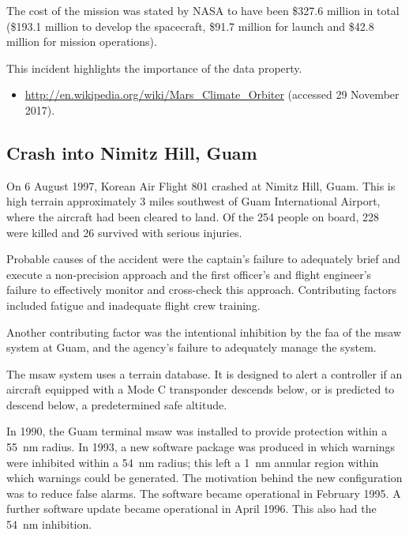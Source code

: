 The cost of the mission was stated by NASA to have been \$327.6 million in total (\$193.1 million to develop the spacecraft, \$91.7 million for launch and \$42.8 million for mission operations). 

This incident highlights the importance of the  \gls{data property}.

\begin{itemize}
  \item \raggedright{\href{http://en.wikipedia.org/wiki/Mars_Climate_Orbiter}{http://en.wikipedia.org/wiki/Mars\_Climate\_Orbiter} (accessed 29 November 2017).}
\end{itemize}


\subsection{Crash into Nimitz Hill, Guam \label{bkm:incacc:nimitzhill}}
On 6 August 1997, Korean Air Flight 801 crashed at Nimitz Hill, Guam. This is high terrain approximately 3 miles southwest of Guam International Airport, where the aircraft had been cleared to land. Of the 254 people on board, 228 were killed and 26 survived with serious injuries.

Probable causes of the accident were the captain's failure to adequately brief and execute a non-precision approach and the first officer's and flight engineer's failure to effectively monitor and cross-check this approach. Contributing factors included fatigue and inadequate flight crew training.

Another contributing factor was the intentional inhibition by the \gls{faa} of the \gls{msaw} system at Guam, and the agency's failure to adequately manage the system.

The \gls{msaw} system uses a terrain \gls{database}. It is designed to alert a controller if an aircraft equipped with a Mode C transponder descends below, or is predicted to descend below, a predetermined safe altitude.

In 1990, the Guam terminal \gls{msaw} was installed to provide protection within a 55~nm radius. In 1993, a new software package was produced in which warnings were inhibited within a 54~nm radius; this left a 1~nm annular region within which warnings could be generated. The motivation behind the new configuration was to reduce false alarms. The software became operational in February 1995. A further software update became operational in April 1996. This also had the 54~nm inhibition.

